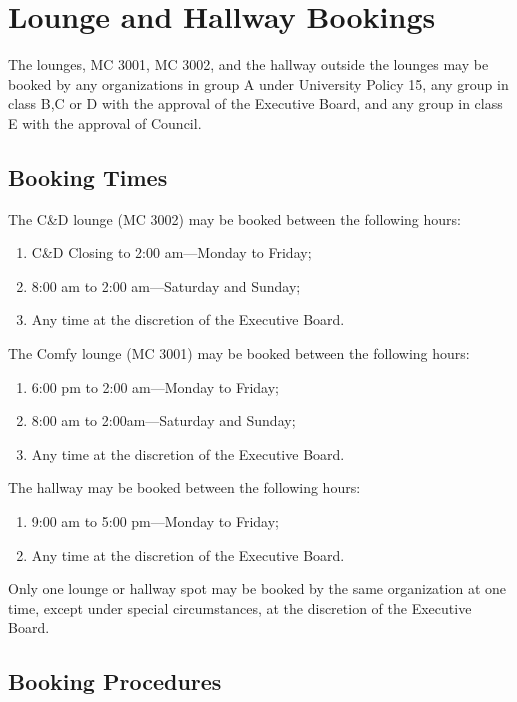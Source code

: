 \section{Lounge and Hallway Bookings}
The lounges, MC 3001, MC 3002, and the hallway outside the lounges may be booked by 
any organizations in group A under University Policy 15, any group in class B,C or D with the 
approval of the Executive Board, and any group in class E with the approval of Council.

\subsection{Booking Times}

The C\&D lounge (MC 3002) may be booked between the following hours:
\begin{enumerate}
  \item C\&D Closing to 2:00 am---Monday to Friday;
  \item 8:00 am to 2:00 am---Saturday and Sunday;
  \item Any time at the discretion of the Executive Board.
\end{enumerate}

The Comfy lounge (MC 3001) may be booked between the following hours:

\begin{enumerate}
  \item 6:00 pm to 2:00 am---Monday to Friday;
  \item 8:00 am to 2:00am---Saturday and Sunday;
  \item Any time at the discretion of the Executive Board.
\end{enumerate}

The hallway may be booked between the following hours:

\begin{enumerate}
  \item 9:00 am to 5:00 pm---Monday to Friday;
  \item Any time at the discretion of the Executive Board.
\end{enumerate}

Only one lounge or hallway spot may be booked by the same organization at one
time, except under special circumstances, at the discretion of the Executive
Board.

\subsection{Booking Procedures}

